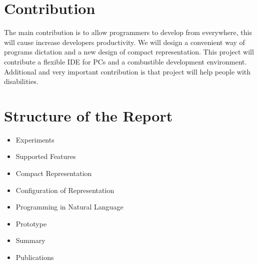 \section{Contribution}
The main contribution is to allow programmers to develop from everywhere, this will cause increase developers productivity. We will design  a convenient way of programs dictation and a new design of compact representation. This project will contribute a flexible IDE for PCs and a combustible development environment. Additional and very important contribution is that project will help people with disabilities.
\section{Structure of the Report}
\begin{itemize}
	\item Experiments
	\item Supported Features
	\item Compact Representation
	\item Configuration of Representation
	\item Programming in Natural Language
	\item Prototype
	\item Summary
	\item Publications
\end{itemize}
